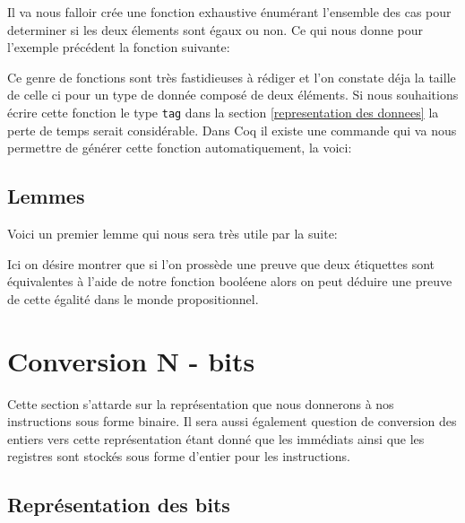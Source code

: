 \documentclass {article}
\newcommand{\codefrom}[3]
           {}
\theoremstyle{definition}
\theoremstyle{remark}
\newcommand{\fun}[1]{\lstinline!#1!}
\begin{document}
Il va nous falloir crée une fonction exhaustive énumérant l'ensemble des cas pour determiner
si les deux élements sont égaux ou non. Ce qui nous donne pour l'exemple précédent la fonction suivante:

\codefrom{rapport}{definitions}{equal}

Ce genre de fonctions sont très fastidieuses à rédiger et l'on constate déja la taille de celle ci
pour un type de donnée composé de deux éléments.
Si nous souhaitions écrire cette fonction le type \fun{tag} dans
la section \ref{representation des donnees} la perte de temps serait considérable.
Dans Coq il existe une commande qui va nous permettre de générer cette fonction
automatiquement, la voici:

\codefrom{rapport}{definitions}{SchemeEqual}



\subsection{Lemmes}
\label{LemmesAST}
Voici un premier lemme qui nous sera très utile par la suite:
\codefrom{src}{ast_instructions}{tag_beq_different}
Ici on désire montrer que si l'on prossède une preuve que deux étiquettes sont équivalentes
à l'aide de notre fonction booléene alors on peut déduire une preuve
de cette égalité dans le monde propositionnel.








\section{Conversion N - bits}
\label{Section Conversion N liste B}

Cette section s'attarde sur la représentation que nous donnerons à nos instructions
sous forme binaire. Il sera aussi également question de conversion des entiers vers cette
représentation étant donné que les immédiats ainsi que les registres sont stockés sous forme d'entier
pour les instructions.



\subsection{Représentation des bits}
\end{document}
